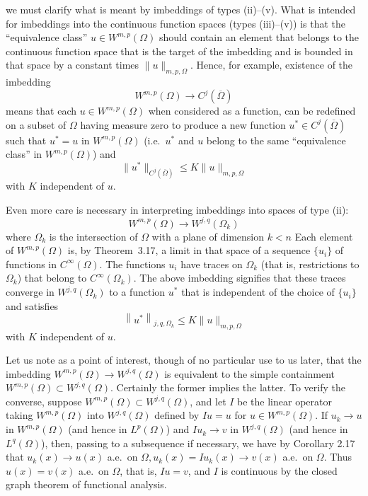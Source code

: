 \begin{para}
  we must clarify what is meant by imbeddings of types (ii)--(v).
  What is intended for imbeddings into the continuous function spaces (types (iii)--(v)) is that 
  the ``equivalence class'' $u \in W^{m,p}(\Omega)$ should contain an element that belongs to the 
  continuous function space that is the target of the imbedding and is bounded in that space by a 
  constant times $\|u\|_{m,p,\Omega}$. Hence, for example, existence of the imbedding
  \[
  W^{m,p}(\Omega) \rightarrow C^j(\overline{\Omega})
  \]
  means that each $u \in W^{m,p}(\Omega)$ when considered as a function,
  can be redefined on a subset of $\Omega$ having measure zero to produce
  a new function $u^* \in C^j(\overline{\Omega})$ such that $u^*=u$ in $W^{m,p}(\Omega)$
  (i.e.~$u^*$ and $u$ belong to the same ``equivalence class'' in $W^{m,p}(\Omega)$) and
  \[
    \|u^*\|_{C^j(\overline{\Omega})} \leq K\|u\|_{m, p, \Omega}
  \]
  with $K$ independent of $u$.
  
  Even more care is necessary in interpreting imbeddings into spaces of type (ii):
  \[
    W^{m,p}(\Omega) \rightarrow W^{j, q}(\Omega_k)
  \]
  where $\Omega_k$ is the intersection of $\Omega$ with a plane of dimension $k<n$
  Each element of $W^{m,p}(\Omega)$ is, by Theorem~3.17, a limit in that space of a sequence 
  $\{u_i\}$ of functions in $C^{\infty}(\Omega)$.
  The functions $u_i$ have traces on $\Omega_k$ (that is, restrictions to $\Omega_k$) that belong 
  to $C^{\infty}(\Omega_k)$. The above imbedding signifies that these traces converge 
  in $W^{j,q}(\Omega_k)$ to a function $u^*$ that is independent of the choice of 
  $\{u_i\}$ and satisfies
  \[
  \left\|u^*\right\|_{j, q, \Omega_k} \leq K\|u\|_{m, p, \Omega}
  \]
  with $K$ independent of $u$.
\end{para}


\begin{para}
  Let us note as a point of interest, though of no particular use to us later,
  that the imbedding $W^{m,p}(\Omega) \rightarrow W^{j,q}(\Omega)$ is equivalent to the simple 
  containment $W^{m,p}(\Omega) \subset W^{j, q}(\Omega)$. Certainly the former implies the 
  latter. To verify the converse, suppose $W^{m,p}(\Omega) \subset W^{j,q}(\Omega)$, and let $I$ 
  be the linear operator taking $W^{m,p}(\Omega)$ into $W^{j,q}(\Omega)$ defined by $I u=u$ for 
  $u \in W^{m,p}(\Omega)$. If $u_k \rightarrow u$ in $W^{m,p}(\Omega)$
  (and hence in $L^p(\Omega)$) and $I u_k \rightarrow v$ in $W^{j,q}(\Omega)$
  (and hence in $L^q(\Omega)$), then, passing to a subsequence if necessary,
  we have by Corollary 2.17 that
  $u_k(x) \rightarrow u(x)$ a.e.~on $\Omega, u_k(x)=I u_k(x) \rightarrow v(x)$ a.e.~on $\Omega$. 
  Thus $u(x)=v(x)$ a.e.~on $\Omega$, that is, $I u=v$, and $I$ is continuous by the closed graph 
  theorem of functional analysis.
\end{para}


